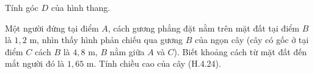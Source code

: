 \begin{exercises}
\begin{questions}[resume=SGK]
\begin{questions}
            \answerline
            \answerline
            \answerline
            \answerline
            \item Tính góc $D$ của hình thang.

            \answerline
            \answerline
        \end{questions}

        \item Một người đứng tại điểm $A$, cách gương phẳng đặt nằm trên mặt đất tại điểm $B$ là $1{,}2$ m, nhìn thấy hình phản chiếu qua gương $B$ của ngọn cây (cây có gốc ở tại điểm $C$ cách $B$ là $4{,}8$ m, $B$ nằm giữa $A$ và $C$). Biết khoảng cách từ mặt đất đến mắt người đó là $1{,}65$ m. Tính chiều cao của cây (H.4.24).

        \answerline
        \answerline
        \answerline
    \end{questions}
\end{exercises}


